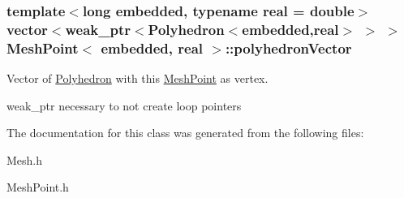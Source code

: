 \subsubsection[{\texorpdfstring{polyhedron\+Vector}{polyhedronVector}}]{\setlength{\rightskip}{0pt plus 5cm}template$<$long embedded, typename real = double$>$ vector$<$weak\+\_\+ptr$<${\bf Polyhedron}$<$embedded,real$>$ $>$ $>$ {\bf Mesh\+Point}$<$ embedded, real $>$\+::polyhedron\+Vector\hspace{0.3cm}{\ttfamily [protected]}}\hypertarget{class_mesh_point_a675c54208346d021ad9a90e382f9c1d3}{}\label{class_mesh_point_a675c54208346d021ad9a90e382f9c1d3}


Vector of \hyperlink{class_polyhedron}{Polyhedron} with this \hyperlink{class_mesh_point}{Mesh\+Point} as vertex. 

weak\+\_\+ptr necessary to not create loop pointers 

The documentation for this class was generated from the following files\+:\begin{DoxyCompactItemize}
\item 
Mesh.\+h\item 
Mesh\+Point.\+h\end{DoxyCompactItemize}
